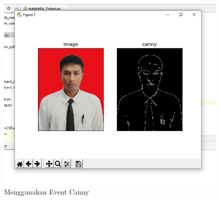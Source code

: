 \newpage
\begin{figure}[ht]
\centering
\includegraphics[scale=0.6]{figures/2,69.jpg}
\caption{Menggunakan Event Canny}
\label{contoh}
\end{figure}




\newpage
